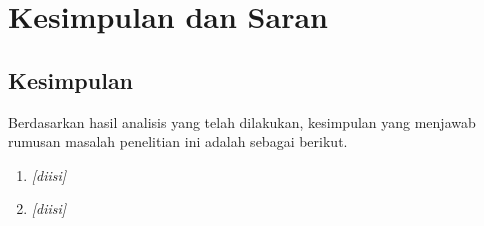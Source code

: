 \chapter{Kesimpulan dan Saran}\label{ch:summary}

    \section{Kesimpulan}\label{sec:conclusion}

        Berdasarkan hasil analisis yang telah dilakukan, kesimpulan yang menjawab rumusan masalah penelitian ini adalah sebagai berikut.
        \begin{enumerate}
            \item %
                  \textit{[diisi]}
            \item %
                  \textit{[diisi]}
        \end{enumerate}


